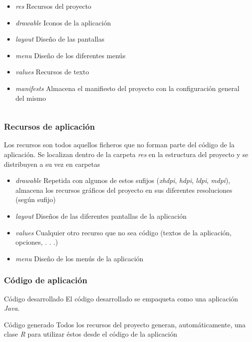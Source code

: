 \documentclass[xcolor={dvipsnames}]{beamer}
\begin{document}
\begin{frame}
\begin{columns}
\begin{column}{6cm}
\begin{block}{}
\begin{itemize}
            \item \emph{\textcolor{resalta}{res}} Recursos del proyecto
            \item \emph{\textcolor{resalta}{drawable}} Iconos de la aplicación
            \item \emph{\textcolor{resalta}{layout}} Diseño de las pantallas
            \item \emph{\textcolor{resalta}{menu}} Diseño de los diferentes menús
            \item \emph{\textcolor{resalta}{values}} Recursos de texto
            \item \emph{\textcolor{resalta}{manifests}} Almacena el manifiesto del proyecto con la configuración general del mismo
        \end{itemize}
        \end{block}
        \end{column}
        \end{columns}
    \end{frame}

\begin{frame}\frametitle{Recursos de aplicación}
    \begin{block}{}
    Los recursos son todos aquellos ficheros que no forman parte del código de la aplicación. Se localizan dentro de la carpeta
    \emph{\textcolor{resalta}{res}}
    en la estructura del proyecto y se distribuyen a su vez en carpetas
    \end{block}
    \begin{itemize}
        \pause \item \emph{\textcolor{resalta}{drawable}} Repetida con algunos de estos sufijos (\emph{xhdpi}, \emph{hdpi}, \emph{ldpi}, \emph{mdpi}),
        almacena los recursos gráficos del proyecto en sus diferentes resoluciones (según sufijo)
        \pause \item \emph{\textcolor{resalta}{layout}} Diseños de las diferentes pantallas de la aplicación
        \pause \item \emph{\textcolor{resalta}{values}} Cualquier otro recurso que no sea código (textos de la aplicación, opciones, . . .)
        \pause \item \emph{\textcolor{resalta}{menu}} Diseño de los menús de la aplicación
    \end{itemize}
\end{frame}

\begin{frame}\frametitle{Código de aplicación}
    \begin{block}{Código desarrollado}
    El código desarrollado se empaqueta como una aplicación \emph{Java}.
    \end{block}
    \begin{block}{Código generado}
    Todos los recursos del proyecto generan, automáticamente, una clase \emph{\textcolor{resalta}{R}} para utilizar éstos desde el código de la aplicación
    \end{block}
\end{frame}
\end{document}
